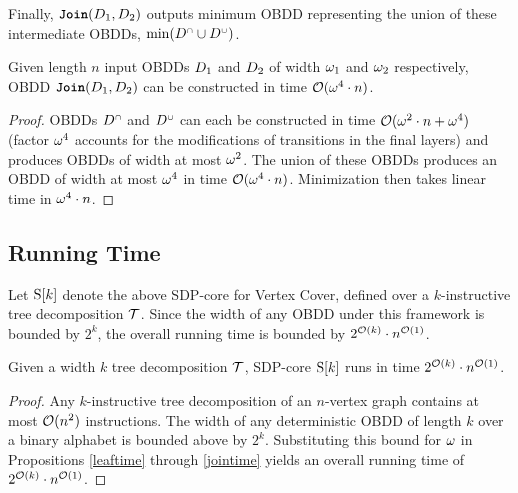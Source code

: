 Finally, $\texttt{\textbf{Join}}(D_1,D_2)$ outputs minimum OBDD representing the union of these intermediate OBDDs, $\mathrm{min}(D^{{\scriptscriptstyle\cap}} \cup D^{{\scriptscriptstyle\cup}})$.

\begin{proposition}\label{jointime}
    Given length $n$ input OBDDs $D_1$ and $D_2$ of width $\omega_1$ and $\omega_2$ respectively, OBDD $\texttt{\textbf{Join}}(D_1, D_2)$ can be constructed in time ${\mathcal{O}(\omega^4\cdot n)}$. 
\end{proposition}
\begin{proof}
    OBDDs $D^{{\scriptscriptstyle\cap}} $ and $D^{{\scriptscriptstyle\cup}}$ can each be constructed in time $\mathcal{O}(\omega^2\cdot n + \omega^4)$ (factor $\omega^4$ accounts for the modifications of transitions in the final layers) and produces OBDDs of width at most $\omega^2$. The union of these OBDDs produces an OBDD of width at most $\omega^4$ in time $\mathcal{O}(\omega^4\cdot n)$. Minimization then takes linear time in $\omega^4\cdot n$.
\end{proof}


\subsection{Running Time}

Let $\mathrm{S}[k]$ denote the above SDP-core for {\sc Vertex Cover},
defined over a $k$-instructive tree decomposition $\mathcal{T}$. Since the width
of any OBDD under this framework is bounded by $2^k$, the overall running time
is bounded by $2^{\mathcal{O}(k)} \cdot n^{\mathcal{O}(1)}$.

\begin{proposition}
    Given a width $k$ tree decomposition $\mathcal{T}$, SDP-core $\mathrm{S}[k]$ runs in time $2^{\mathcal{O}(k)}\cdot n^{\mathcal{O}(1)}$.
\end{proposition}
\begin{proof}
   Any $k$-instructive tree decomposition of an $n$-vertex graph contains at most
$\mathcal{O}(n^2)$ instructions. The width of any deterministic OBDD of length $k$
over a binary alphabet is bounded above by $2^k$. Substituting this bound for
$\omega$ in Propositions \ref{leaftime} through \ref{jointime} yields an overall running time of
$2^{\mathcal{O}(k)} \cdot n^{\mathcal{O}(1)}$.
\end{proof}